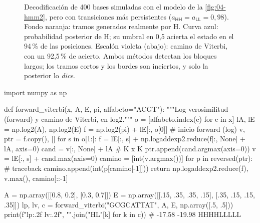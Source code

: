 \begin{figure}[tbp]
\centering
{}
\caption[Decodificación de una secuencia simulada]{Decodificación de 400 bases simuladas con el modelo de la \cref{fig:04-hmm2}, pero con transiciones más persistentes ($a_{\textsf{HH}}=a_{\textsf{LL}}=0{,}98$). Fondo naranja: tramos generados realmente por \textsf{H}. Curva azul: probabilidad posterior de \textsf{H}; su umbral en 0,5 acierta el estado en el 94\,\% de las posiciones. Escalón violeta (abajo): camino de Viterbi, con un 92,5\,\% de acierto. Ambos métodos detectan los bloques largos; los tramos cortos y los bordes son inciertos, y solo la posterior lo \emph{dice}.}
\label{fig:04-posterior}
\end{figure}

\begin{codigo}
import numpy as np

def forward_viterbi(x, A, E, pi, alfabeto="ACGT"):
    """Log-verosimilitud (forward) y camino de Viterbi, en log2."""
    o = [alfabeto.index(c) for c in x]
    lA, lE = np.log2(A), np.log2(E)
    f = np.log2(pi) + lE[:, o[0]]                 # inicio forward (log)
    v, ptr = f.copy(), []
    for s in o[1:]:
        f = lE[:, s] + np.logaddexp2.reduce(f[:, None] + lA, axis=0)
        cand = v[:, None] + lA                     # K x K
        ptr.append(cand.argmax(axis=0))
        v = lE[:, s] + cand.max(axis=0)
    camino = [int(v.argmax())]
    for p in reversed(ptr):                        # traceback
        camino.append(int(p[camino[-1]]))
    return np.logaddexp2.reduce(f), v.max(), camino[::-1]

A = np.array([[0.8, 0.2], [0.3, 0.7]])
E = np.array([[.15, .35, .35, .15], [.35, .15, .15, .35]])
lp, lv, c = forward_viterbi("GCGCATTAT", A, E, np.array([.5, .5]))
print(f"{lp:.2f} {lv:.2f}", "".join("HL"[k] for k in c))
# -17.58 -19.98 HHHHLLLLL
\end{codigo}

